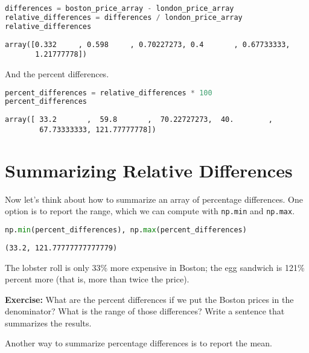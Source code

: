 \begin{lstlisting}[language=Python,style=source]
differences = boston_price_array - london_price_array
relative_differences = differences / london_price_array
relative_differences
\end{lstlisting}

\begin{lstlisting}[style=output]
array([0.332     , 0.598     , 0.70227273, 0.4       , 0.67733333,
       1.21777778])
\end{lstlisting}

And the percent differences.

\begin{lstlisting}[language=Python,style=source]
percent_differences = relative_differences * 100
percent_differences
\end{lstlisting}

\begin{lstlisting}[style=output]
array([ 33.2       ,  59.8       ,  70.22727273,  40.        ,
        67.73333333, 121.77777778])
\end{lstlisting}

\hypertarget{summarizing-relative-differences}{%
\section{Summarizing Relative
Differences}\label{summarizing-relative-differences}}

Now let's think about how to summarize an array of percentage
differences. One option is to report the range, which we can compute
with \passthrough{\lstinline!np.min!} and
\passthrough{\lstinline!np.max!}.

\begin{lstlisting}[language=Python,style=source]
np.min(percent_differences), np.max(percent_differences)
\end{lstlisting}

\begin{lstlisting}[style=output]
(33.2, 121.77777777777779)
\end{lstlisting}

The lobster roll is only 33\% more expensive in Boston; the egg sandwich
is 121\% percent more (that is, more than twice the price).

\textbf{Exercise:} What are the percent differences if we put the Boston
prices in the denominator? What is the range of those differences? Write
a sentence that summarizes the results.

Another way to summarize percentage differences is to report the mean.

